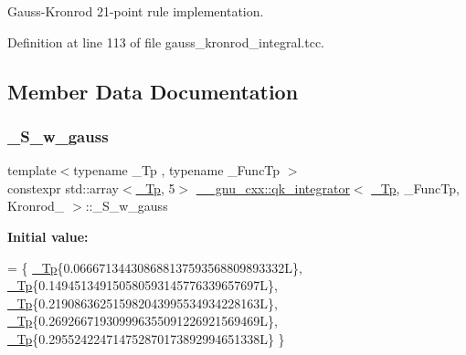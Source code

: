 Gauss-\/\+Kronrod 21-\/point rule implementation. 

Definition at line 113 of file gauss\+\_\+kronrod\+\_\+integral.\+tcc.



\subsection{Member Data Documentation}
\mbox{\label{struct____gnu__cxx_1_1qk__integrator_3_01__Tp_00_01__FuncTp_00_01Kronrod__21_01_4_a0d750319ca4a47e5e3c08aaf733959c0}} 
\subsubsection{\texorpdfstring{\+\_\+\+S\+\_\+w\+\_\+gauss}{\_S\_w\_gauss}}
{\footnotesize\ttfamily template$<$typename \+\_\+\+Tp , typename \+\_\+\+Func\+Tp $>$ \\
constexpr std\+::array$<$\hyperlink{namespace____gnu__cxx_a3b19a9c800ca194374ef9172290f7d79}{\+\_\+\+Tp}, 5$>$ \hyperlink{class____gnu__cxx_1_1qk__integrator}{\+\_\+\+\_\+gnu\+\_\+cxx\+::qk\+\_\+integrator}$<$ \hyperlink{namespace____gnu__cxx_a3b19a9c800ca194374ef9172290f7d79}{\+\_\+\+Tp}, \+\_\+\+Func\+Tp, Kronrod\+\_ $>$\+::\+\_\+\+S\+\_\+w\+\_\+gauss\hspace{0.3cm}{\ttfamily [static]}}

{\bfseries Initial value\+:}
\begin{DoxyCode}
=
      \{
        \hyperlink{namespace____gnu__cxx_a3b19a9c800ca194374ef9172290f7d79}{\_Tp}\{0.066671344308688137593568809893332L\},
        \hyperlink{namespace____gnu__cxx_a3b19a9c800ca194374ef9172290f7d79}{\_Tp}\{0.149451349150580593145776339657697L\},
        \hyperlink{namespace____gnu__cxx_a3b19a9c800ca194374ef9172290f7d79}{\_Tp}\{0.219086362515982043995534934228163L\},
        \hyperlink{namespace____gnu__cxx_a3b19a9c800ca194374ef9172290f7d79}{\_Tp}\{0.269266719309996355091226921569469L\},
        \hyperlink{namespace____gnu__cxx_a3b19a9c800ca194374ef9172290f7d79}{\_Tp}\{0.295524224714752870173892994651338L\}
      \}
\end{DoxyCode}


